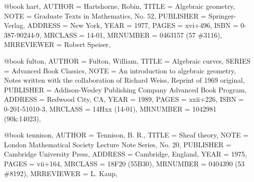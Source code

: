 @book {hart,
    AUTHOR = {Hartshorne, Robin},
     TITLE = {Algebraic geometry},
      NOTE = {Graduate Texts in Mathematics, No. 52},
 PUBLISHER = {Springer-Verlag},
   ADDRESS = {New York},
      YEAR = {1977},
     PAGES = {xvi+496},
      ISBN = {0-387-90244-9},
   MRCLASS = {14-01},
  MRNUMBER = {0463157 (57 \#3116)},
MRREVIEWER = {Robert Speiser},
}

@book {fulton,
    AUTHOR = {Fulton, William},
     TITLE = {Algebraic curves},
    SERIES = {Advanced Book Classics},
      NOTE = {An introduction to algebraic geometry,
              Notes written with the collaboration of Richard Weiss,
              Reprint of 1969 original},
 PUBLISHER = {Addison-Wesley Publishing Company Advanced Book Program},
   ADDRESS = {Redwood City, CA},
      YEAR = {1989},
     PAGES = {xxii+226},
      ISBN = {0-201-51010-3},
   MRCLASS = {14Hxx (14-01)},
  MRNUMBER = {1042981 (90k:14023)},
}

@book {tennison,
    AUTHOR = {Tennison, B. R.},
     TITLE = {Sheaf theory},
      NOTE = {London Mathematical Society Lecture Note Series, No. 20},
 PUBLISHER = {Cambridge University Press},
   ADDRESS = {Cambridge, England},
      YEAR = {1975},
     PAGES = {vii+164},
   MRCLASS = {18F20 (55B30)},
  MRNUMBER = {0404390 (53 \#8192)},
MRREVIEWER = {L. Kaup},
}
